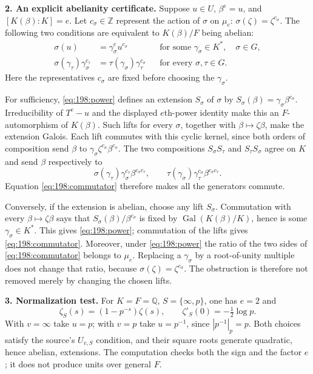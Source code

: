 \documentclass[11pt,a4paper]{article}
\newcommand{\Z}{\mathbb{Z}}
\newcommand{\Q}{\mathbb{Q}}
\numberwithin{equation}{section}
\begin{document}
\textbf{2. An explicit abelianity certificate.}
Suppose $u\in U$, $\beta^e=u$, and $[K(\beta):K]=e$. Let
$c_\sigma\in\Z$ represent the action of $\sigma$ on $\mu_e$:
$\sigma(\zeta)=\zeta^{c_\sigma}$. The following two conditions are
equivalent to $K(\beta)/F$ being abelian:
\begin{align}
 \sigma(u)&=\gamma_\sigma^e u^{c_\sigma}
       &&\text{for some }\gamma_\sigma\in K^*,\quad\sigma\in G,
       \label{eq:198:power}\\
 \sigma(\gamma_\tau)\gamma_\sigma^{c_\tau}
       &=\tau(\gamma_\sigma)\gamma_\tau^{c_\sigma}
       &&\text{for every }\sigma,\tau\in G.
       \label{eq:198:commutator}
\end{align}
Here the representatives $c_\sigma$ are fixed before choosing the
$\gamma_\sigma$.

For sufficiency, \eqref{eq:198:power} defines an extension
$S_\sigma$ of $\sigma$ by
$S_\sigma(\beta)=\gamma_\sigma\beta^{c_\sigma}$.
Irreducibility of $T^e-u$ and the displayed $e$th-power identity make
this an $F$-automorphism of $K(\beta)$. Such lifts for every $\sigma$,
together with $\beta\mapsto\zeta\beta$, make the extension Galois.
Each lift commutes with this cyclic kernel, since both orders of
composition send $\beta$ to
$\gamma_\sigma\zeta^{c_\sigma}\beta^{c_\sigma}$.
The two compositions $S_\sigma S_\tau$ and $S_\tau S_\sigma$ agree
on $K$ and send $\beta$ respectively to
\[
 \sigma(\gamma_\tau)\gamma_\sigma^{c_\tau}
       \beta^{c_\sigma c_\tau},\qquad
 \tau(\gamma_\sigma)\gamma_\tau^{c_\sigma}
       \beta^{c_\sigma c_\tau}.
\]
Equation \eqref{eq:198:commutator} therefore makes all the generators
commute.

Conversely, if the extension is abelian, choose any lift $S_\sigma$.
Commutation with every $\beta\mapsto\zeta\beta$ says that
$S_\sigma(\beta)/\beta^{c_\sigma}$ is fixed by
$\operatorname{Gal}(K(\beta)/K)$, hence is some
$\gamma_\sigma\in K^*$. This gives \eqref{eq:198:power}; commutation
of the lifts gives \eqref{eq:198:commutator}. Moreover, under
\eqref{eq:198:power} the ratio of the two sides of
\eqref{eq:198:commutator} belongs to $\mu_e$. Replacing a
$\gamma_\sigma$ by a root-of-unity multiple does not change that
ratio, because $\sigma(\zeta)=\zeta^{c_\sigma}$. The obstruction is
therefore not removed merely by changing the chosen lifts.

\textbf{3. Normalization test.}
For $K=F=\Q$, $S=\{\infty,p\}$, one has $e=2$ and
\[
 \zeta_S(s)=(1-p^{-s})\zeta(s),\qquad
                  \zeta'_S(0)=-\tfrac12\log p.
\]
With $v=\infty$ take $u=p$; with $v=p$ take $u=p^{-1}$, since
$|p^{-1}|_p=p$. Both choices satisfy the source's $U_{v,S}$ condition,
and their square roots generate quadratic, hence abelian, extensions.
The computation checks both the sign and the factor $e$; it does not
produce units over general $F$.
\end{document}
